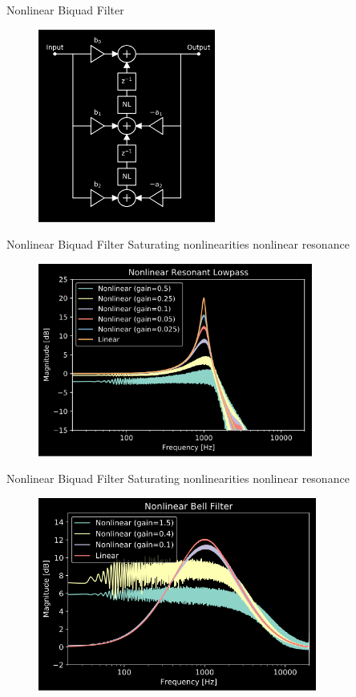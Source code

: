 \begin{frame}{Nonlinear Biquad Filter}
    \begin{figure}
        \includegraphics[height=2.5in]{../NonlinearBiquad/Pics/NL-TDF-II.png}
    \end{figure}
\end{frame}

\begin{frame}{Nonlinear Biquad Filter}
    Saturating nonlinearities \rightarrow nonlinear resonance
    \begin{figure}
        \includegraphics[height=2.5in]{../NonlinearBiquad/Pics/NL-LPF-Dark.png}
    \end{figure}
\end{frame}

\begin{frame}{Nonlinear Biquad Filter}
    Saturating nonlinearities \rightarrow nonlinear resonance
    \begin{figure}
        \includegraphics[height=2.5in]{../NonlinearBiquad/Pics/NL-Bell.png}
    \end{figure}
\end{frame}

